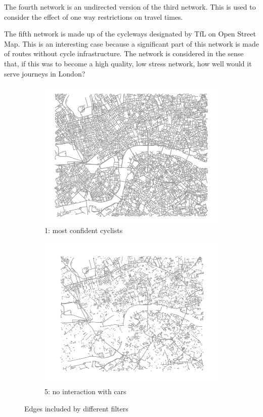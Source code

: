 \documentclass[11pt]{article} %
\begin{document}
The fourth network is an undirected version of the third network. This is used to consider the effect of one way restrictions on travel times. 

The fifth network is made up of the cycleways designated by TfL on Open Street Map. This is an interesting case because a significant part of this network is made of routes without cycle infrastructure. The network is considered in the sense that, if this was to become a high quality, low stress network, how well would it serve journeys in London? 

\begin{figure}
\centering
\begin{subfigure}{.5\textwidth}
  \centering
  \includegraphics[width=1\linewidth]{bbox_bike_1_filter_cropped}
  \caption{1: most confident cyclists}
  \label{fig:sub1}
\end{subfigure}%
\begin{subfigure}{.5\textwidth}
  \centering
  \includegraphics[width=1\linewidth]{bbox_bike_5_filter_cropped}
  \caption{5: no interaction with cars }
  \label{fig:sub2}
\end{subfigure}
\caption{Edges included by different filters}
\label{fig:test}
\end{figure}
\end{document}
